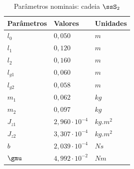 \documentclass[]{politex}
\begin{document}
\begin{multicols}{2}
\begin{table}[H] 
\centering
\caption{Parâmetros nominais: cadeia $\ssS_2$}
\label{tab:parametrosSimulacao2}
\begin{tabular}{l|l|l}
Parâmetros   & Valores                    & Unidades   \\ \hline
$l_0$        & $0{,}050$                    & $m$        \\
$l_1$        & $0{,}120$                    & $m$        \\
$l_2$        & $0{,}160$                    & $m$        \\
$l_{g1}$     & $0{,}060$                    & $m$        \\
$l_{g2}$     & $0{,}058$                    & $m$        \\
$m_1$        & $0{,}062$                    & $kg$       \\
$m_2$        & $0{,}097$                    & $kg$       \\
$J_{z1}$     & $2{,}960   \cdot 10^{-4}$    & $kg.m^{2}$ \\
$J_{z2}$     & $3{,}307   \cdot 10^{-4}$    & $kg.m^{2}$ \\
$b$          & $2{,}039 \cdot 10^{-4}$      & $N s$      \\
$\gmu$       & $4{,}992 \cdot 10^{-2}$      & $Nm$        \\
\end{tabular}
\end{table}
\end{multicols}
\end{document}
